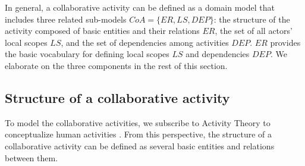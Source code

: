 In general, a collaborative activity can be defined as a domain model that includes three related sub-models $CoA=\{ER, LS, DEP\}$: the structure of the activity composed of basic entities and their relations $ER$, the set of all actors' local scopes $LS$, and the set of dependencies among activities $DEP$. $ER$ provides the basic vocabulary for defining local scopes $LS$ and dependencies $DEP$. We elaborate on the three components in the rest of this section. 

\subsection{Structure of a collaborative activity} %
\label{sub:structure_of_a_collaborative_activity}
To model the collaborative activities, we subscribe to Activity Theory to conceptualize human activities \cite{nardi1996context}. From this perspective, the structure of a collaborative activity can be defined as several basic entities and relations between them.

